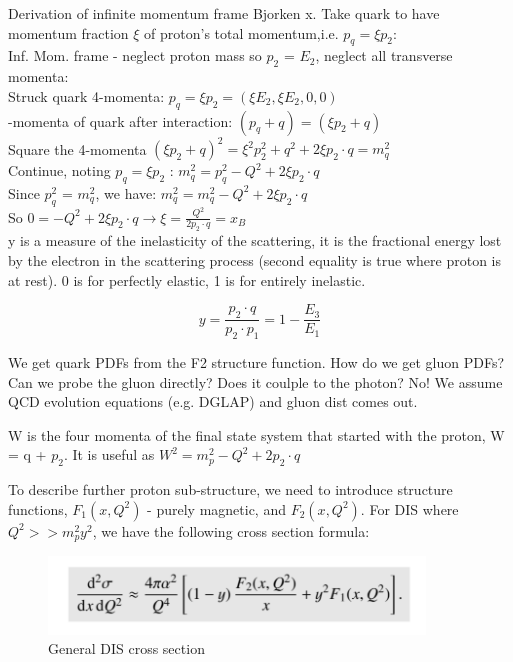     
            Derivation of infinite momentum frame Bjorken x. Take quark to have momentum fraction $\xi$ of proton's total momentum,i.e. $p_q = \xi p_2$:\\
            \indent Inf. Mom. frame - neglect proton mass so $p_2$ = $E_2$, neglect all transverse momenta:\\
            \indent Struck quark 4-momenta: $p_q = \xi p_2 = (\xi E_2, \xi E_2, 0, 0)$\\
            -momenta of quark after interaction: $(p_q + q) = (\xi p_2 +q)$\\
            \indent Square the 4-momenta $(\xi p_2 +q)^2 = \xi^2 p_2^2 +q^2 + 2\xi p_2 \cdot q  = m_q^2$\\
            \indent Continue, noting $p_q = \xi p_2$ : $m_q^2 = p_q^2 - Q^2 + 2 \xi p_2 \cdot q$\\
            \indent Since $p_q^2$ = $m_q^2$, we have: $m_q^2 = m_q^2 -Q^2 + 2 \xi p_2 \cdot q$\\
            \indent So $0 = -Q^2 + 2\xi p_2 \cdot q \longrightarrow \xi = \frac{Q^2}{2 p_2 \cdot q} = x_B$\\
        
        
        y is a measure of the inelasticity of the scattering, it is the fractional energy lost by the electron in the scattering process (second equality is true where proton is at rest). 0 is for perfectly elastic, 1 is for entirely inelastic. 
        
        \begin{equation}
            y = \frac{p_2 \cdot q}{p_2 \cdot p_1} = 1 - \frac{E_3}{E_1}
        \end{equation}
        

We get quark PDFs from the F2 structure function. How do we get gluon PDFs? Can we probe the gluon directly? Does it coulple to the photon? No! We assume QCD evolution equations (e.g. DGLAP) and gluon dist comes out. 


            W is the four momenta of the final state system that started with the proton, W = q + $p_2$. It is useful as $W^2 = m_p^2 -Q^2 + 2 p_2 \cdot q$
        
        \indent To describe further proton sub-structure, we need to introduce structure functions, $F_1(x,Q^2)$ - purely magnetic, and $F_2(x,Q^2)$. For DIS where $Q^2 >> m_p^2y^2$, we have the following cross section formula:
        
        \begin{figure}[H]
            \centering
            \includegraphics[width=10cm]{Chapters/Ch1-Intro/Ch1-Sec1-Background/pics/inelastic-ep/dis-xsection.PNG}
            \caption{General DIS cross section}
        \end{figure}

